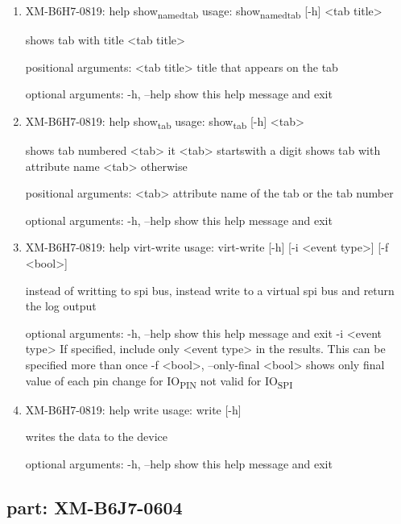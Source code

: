 \documentclass[11pt]{article}
\begin{document}
\begin{enumerate}
\item XM-B6H7-0819: help show\textsubscript{named}\textsubscript{tab}
\label{sec:orgea70c42}
usage: show\textsubscript{named}\textsubscript{tab} [-h] <tab title>

shows tab with title <tab title>

positional arguments:
  <tab title>  title that appears on the tab

optional arguments:
  -h, --help   show this help message and exit

\item XM-B6H7-0819: help show\textsubscript{tab}
\label{sec:org1e84f61}
usage: show\textsubscript{tab} [-h] <tab>

shows tab numbered <tab> it <tab> startswith a digit shows tab with attribute
name <tab> otherwise

positional arguments:
  <tab>       attribute name of the tab or the tab number

optional arguments:
  -h, --help  show this help message and exit

\item XM-B6H7-0819: help virt-write
\label{sec:org1df8704}
usage: virt-write [-h] [-i <event type>] [-f <bool>]

instead of writting to spi bus, instead write to a virtual spi bus and return
the log output

optional arguments:
  -h, --help            show this help message and exit
  -i <event type>       If specified, include only <event type> in the
                        results. This can be specified more than once
  -f <bool>, --only-final <bool>
                        shows only final value of each pin change for IO\textsubscript{PIN}
                        not valid for IO\textsubscript{SPI}

\item XM-B6H7-0819: help write
\label{sec:orga59cc63}
usage: write [-h]

writes the data to the device

optional arguments:
  -h, --help  show this help message and exit
\end{enumerate}

\subsection{part: XM-B6J7-0604}
\label{sec:org8c9ad03}
\end{document}
